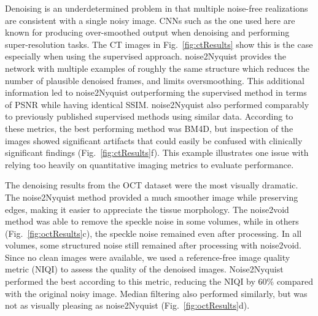 \documentclass[journal,twoside,web]{ieeecolor}
\begin{document}
Denoising is an underdetermined problem in that multiple noise-free realizations are consistent with a single noisy image. CNNs such as the one used here are known for producing over-smoothed output when denoising\cite{Zhao2019} and performing super-resolution tasks\cite{Lai2017}. The CT images in Fig.~\ref{fig:ctResults} show this is the case especially when using the supervised approach. noise2Nyquist provides the network with multiple examples of roughly the same structure which reduces the number of plausible denoised frames, and limits oversmoothing. This additional information led to noise2Nyquist outperforming the supervised method in terms of PSNR while having identical SSIM. noise2Nyquist also performed comparably to previously published supervised methods using similar data\cite{Gou2019}. According to these metrics, the best performing method was BM4D, but inspection of the images showed significant artifacts that could easily be confused with clinically significant findings (Fig.~\ref{fig:ctResults}f). This example illustrates one issue with relying too heavily on quantitative imaging metrics to evaluate performance.

The denoising results from the OCT dataset were the most visually dramatic. The noise2Nyquist method provided a much smoother image while preserving edges, making it easier to appreciate the tissue morphology. The noise2void method was able to remove the speckle noise in some volumes, while in others (Fig.~\ref{fig:octResults}c), the speckle noise remained even after processing. In all volumes, some structured noise still remained after processing with noise2void. Since no clean images were available, we used a reference-free image quality metric (NIQI) to assess the quality of the denoised images. Noise2Nyquist performed the best according to this metric, reducing the NIQI by 60\% compared with the original noisy image. Median filtering also performed similarly, but was not as visually pleasing as noise2Nyquist (Fig.~\ref{fig:octResults}d).
\end{document}
